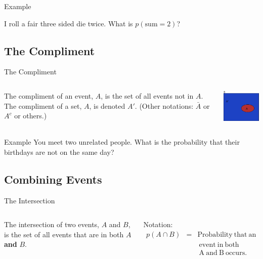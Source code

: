 \begin{frame}{Example}

  I roll a fair three sided die twice. What is $p(\mathrm{sum}=2)$?
  
\end{frame}

\subsection{The Compliment}

\begin{frame}{The Compliment}

  \begin{columns}
    \begin{definition}
      The compliment of an event, $A$, is the set of all events not in
      $A$.  The compliment of a set, $A$, is denoted $A'$. (Other
      notations: $\bar{A}$ or $A^c$ or others.)
    \end{definition}

    \centerline{\includegraphics[width=4cm]{img/compliment}}
  \end{columns}
\end{frame}

\begin{frame}{Example}
  You meet two unrelated people. What is the probability that their
  birthdays are not on the same day?
\end{frame}


\subsection{Combining Events}

\begin{frame}{The Intersection}

  \begin{columns}
    \begin{definition}[Intersection]
      The intersection of two events, $A$ and $B$, is the set of all
      events that are in both $A$ \textbf{and} $B$.
    \end{definition}
    Notation:
    \begin{eqnarray*}
      p(A\cap B) & = & \mathrm{Probability~that~an} \\
                 &   & \mathrm{~event~in~both} \\
                 &   & \mathrm{~A~and~B~occurs.}
    \end{eqnarray*}
  \end{columns}
\end{frame}


